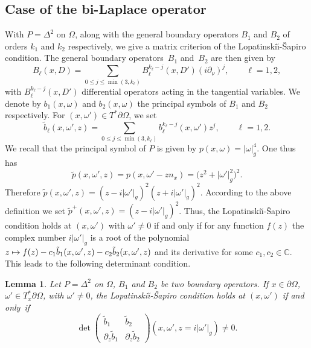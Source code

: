 \documentclass[10pt]{amsart}
\newcommand\mto{\mathchoice{\longmapsto}{\mapsto}{\mapsto}{\mapsto}}
\theoremstyle{plain}
\newtheorem{lemma}[theorem]{Lemma}
\theoremstyle{definition}
\def\C{\mathbb{C}}
\newcommand{\LS}{Lopatinski\u{\i}-\v{S}apiro\xspace}
\begin{document}
\subsection{Case of the bi-Laplace operator}
\label{sec: LS for bi-Laplace}
With $P=\Delta^2$ on $\Omega$, along with the general boundary operators $B_1$ and $B_2$ of orders $k_1$ and $k_2$ respectively, we give a matrix criterion of the \LS condition. The general boundary operators~$B_1$ and~$B_2$ are then given by
\begin{equation*}
B_\ell(x,D)
= \sum_{0\leq j\leq\min(3,k_\ell)}
B_\ell^{k_\ell-j}(x,D') (i \partial_\nu) ^j,
\qquad \ell=1,2,
\end{equation*}
with $B_\ell^{k_\ell-j}(x,D')$ differential operators acting in the
tangential variables.
We denote by $b_1(x,\omega)$ and $b_2(x,\omega)$ the principal symbols of $B_1$ and $B_2$ respectively. For $(x,\omega')\in T^*\partial\Omega$, we set
\begin{equation*}
\tilde{b}_\ell(x,\omega',z)
=\sum_{0\leq j\leq \min(3,k_\ell)}
b_\ell^{k_\ell-j}(x,\omega')z^j,
\qquad \ell=1,2.
\end{equation*}
We recall that the principal symbol of $P$ is given by
$p(x,\omega)=|\omega|^4_g$. One thus has
\begin{equation*}
\tilde{p}(x,\omega',z)=p(x,\omega'-zn_x) = \big(z^2 + |\omega'|_g^2\big)^2.
\end{equation*}
Therefore
$\tilde{p}(x,\omega',z)=(z-i|\omega'|_g)^2(z+i|\omega'|_g)^2$. According
to the above definition we set
$\tilde{p}^+(x,\omega',z)=(z-i|\omega'|_g)^2$. Thus, the
\LS condition holds at $(x,\omega')$ with $\omega'\neq 0$ if
and only if for any function $f(z)$ the complex number $i|\omega'|_g$
is a root of the polynomial $z\mto
f(z)-c_1\tilde{b}_1(x,\omega',z)-c_2\tilde{b}_2(x,\omega',z)$ and its
derivative for some $c_1,c_2\in\C$. This leads to the
following determinant condition.

\begin{lemma}\label{lemma: Lopatinskii bi-laplacian op}
Let $P=\Delta^2$ on $\Omega$, $B_1$ and $B_2$ be two boundary
operators. If $x \in \partial\Omega$, $\omega' \in T_x^* \partial\Omega$, with
$\omega' \neq 0$, the \LS
condition holds at $(x,\omega')$ if and only~if
\begin{equation}\label{cond1}
\det
\begin{pmatrix}
\tilde{b}_1 &\tilde{b}_2 \\[
2pt]
\partial_z\tilde{b}_1& \partial_z\tilde{b}_2
\end{pmatrix} (x,\omega',z=i|\omega'|_g)
\neq 0.
\end{equation}
\end{lemma}
\end{document}
